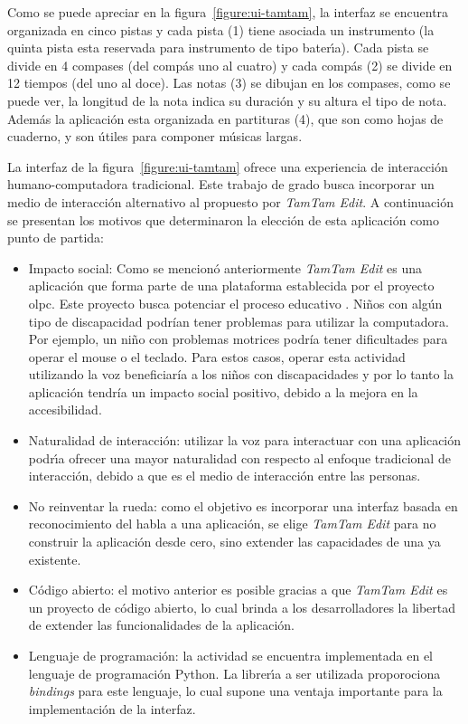 Como se puede apreciar en la figura~\ref{figure:ui-tamtam}, la interfaz se encuentra organizada en cinco pistas 
y cada pista (1) tiene asociada un 
instrumento (la quinta pista esta reservada para instrumento de tipo bater{\'\i}a). Cada pista se divide en 4 
compases (del comp\'as uno al cuatro) y cada comp\'as (2) se divide en 12 tiempos (del uno al doce). 
Las notas (3) se dibujan en los compases, como se puede ver, la longitud de la nota indica su duraci\'on y su 
altura el tipo de nota. Adem\'as la aplicaci\'on esta organizada en partituras (4), que son como hojas de 
cuaderno, y son \'utiles para componer m\'usicas largas.

La interfaz de la figura~\ref{figure:ui-tamtam} ofrece una experiencia de interacci\'on humano-computadora 
tradicional. 
Este trabajo de grado busca incorporar un medio de interacci\'on alternativo al propuesto por \emph{TamTam Edit}. 
A continuaci\'on se presentan los motivos que determinaron la elecci\'on de esta aplicaci\'on como punto de partida:

\begin{itemize}
    \item Impacto social: Como se mencion\'o anteriormente \emph{TamTam Edit} es una aplicaci\'on que forma parte de una plataforma establecida
    por el proyecto \gls{olpc}. Este proyecto busca potenciar el proceso educativo \cite{OLPC}. Ni\~nos con alg\'un tipo de discapacidad podr\'ian tener
    problemas para utilizar la computadora. Por ejemplo, un ni\~no con problemas motrices podr\'ia tener 
    dificultades para operar el mouse o el teclado. Para estos casos, operar esta actividad utilizando la voz
    beneficiar\'ia a los ni\~nos con discapacidades
    y por lo tanto la aplicaci\'on tendr\'ia un impacto social positivo, debido a la mejora en la accesibilidad.
    \item Naturalidad de interacci\'on: utilizar la voz para interactuar con una aplicaci\'on podr{\'\i}a ofrecer 
    una mayor naturalidad con respecto al enfoque tradicional de interacci\'on, debido a que es el medio de
    interacci\'on entre las personas.
    \item No reinventar la rueda: como el objetivo es incorporar una interfaz basada en reconocimiento del
    habla a una aplicaci\'on, se elige \emph{TamTam Edit} para no construir la aplicaci\'on desde cero, sino 
    extender las capacidades de una ya existente.
    \item C\'odigo abierto: el motivo anterior es posible gracias a que \emph{TamTam Edit} es un proyecto de 
    c\'odigo abierto, lo cual brinda a los desarrolladores la libertad de extender las funcionalidades de la 
    aplicaci\'on.
    \item Lenguaje de programaci\'on: la actividad se encuentra implementada en el lenguaje de programaci\'on
    Python. La librer{\'\i}a a ser utilizada proporociona \emph{bindings} para este lenguaje, lo cual supone una
    ventaja importante para la implementaci\'on de la interfaz.
\end{itemize}



